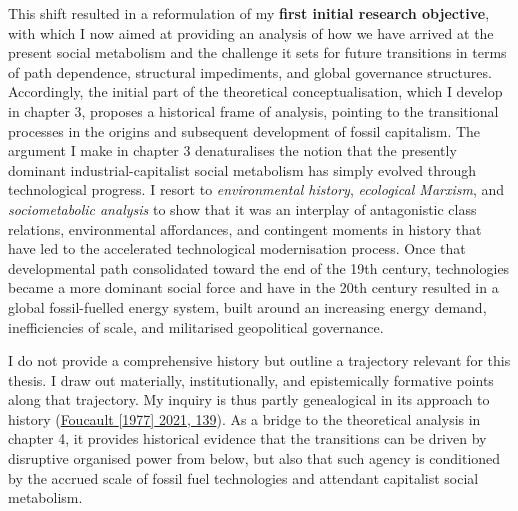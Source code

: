 \documentclass[a4paper, nobind]{templates/ociamthesis}
\begin{document}
This shift resulted in a reformulation of my \textbf{first initial research objective}, with which I now aimed at providing an analysis of how we have arrived at the present social metabolism and the challenge it sets for future transitions in terms of path dependence, structural impediments, and global governance structures. Accordingly, the initial part of the theoretical conceptualisation, which I develop in chapter 3, proposes a historical frame of analysis, pointing to the transitional processes in the origins and subsequent development of fossil capitalism. The argument I make in chapter 3 denaturalises the notion that the presently dominant industrial-capitalist social metabolism has simply evolved through technological progress. I resort to \emph{environmental history}, \emph{ecological Marxism}, and \emph{sociometabolic analysis} to show that it was an interplay of antagonistic class relations, environmental affordances, and contingent moments in history that have led to the accelerated technological modernisation process. Once that developmental path consolidated toward the end of the 19th century, technologies became a more dominant social force and have in the 20th century resulted in a global fossil-fuelled energy system, built around an increasing energy demand, inefficiencies of scale, and militarised geopolitical governance.

I do not provide a comprehensive history but outline a trajectory relevant for this thesis. I draw out materially, institutionally, and epistemically formative points along that trajectory. My inquiry is thus partly genealogical in its approach to history (\protect\hyperlink{ref-foucault_nietzsche_1977}{Foucault {[}1977{]} 2021, 139}). As a bridge to the theoretical analysis in chapter 4, it provides historical evidence that the transitions can be driven by disruptive organised power from below, but also that such agency is conditioned by the accrued scale of fossil fuel technologies and attendant capitalist social metabolism.
\end{document}
